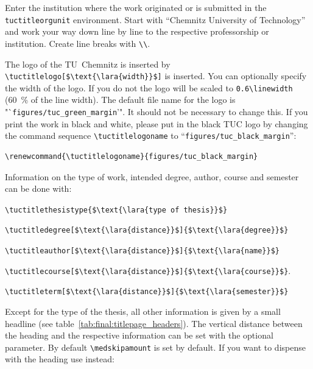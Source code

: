 Enter the institution where the work originated or is submitted in the
\texttt{tuctitleorgunit} environment. Start with "`Chemnitz University of
Technology"' and work your way down line by line to the respective
professorship or institution. Create line breaks with \verb+\\+.

The logo of the TU~Chemnitz is inserted by \lstinline[language={[LaTeX]{TeX}},mathescape]+\tuctitlelogo[$\text{\lara{width}}$]+
is inserted. You can optionally specify the width of the logo. If you do not
the logo will be scaled to \verb+0.6\linewidth+ (\qty{60}{\percent} of the line
width). The default file name for the logo is "`\texttt{figures/tuc\_green\_margin}'".
It should not be necessary to change this. If you print the work in black and
white, please put in the black TUC logo by changing the command sequence
\verb+\tuctitlelogoname+ to "`\texttt{figures/tuc\_black\_margin}"':
%
\begin{lstlisting}[language={[LaTeX]{TeX}},style=block]
\renewcommand{\tuctitlelogoname}{figures/tuc_black_margin}
\end{lstlisting}

Information on the type of work, intended degree, author, course and semester
can be done with:

\begin{compactitem}
\item \lstinline[language={[LaTeX]{TeX}},mathescape]+\tuctitlethesistype{$\text{\lara{type of thesis}}$}+
\item \lstinline[language={[LaTeX]{TeX}},mathescape]+\tuctitledegree[$\text{\lara{distance}}$]{$\text{\lara{degree}}$}+
\item \lstinline[language={[LaTeX]{TeX}},mathescape]+\tuctitleauthor[$\text{\lara{distance}}$]{$\text{\lara{name}}$}+
\item \lstinline[language={[LaTeX]{TeX}},mathescape]+\tuctitlecourse[$\text{\lara{distance}}$]{$\text{\lara{course}}$}+.
\item \lstinline[language={[LaTeX]{TeX}},mathescape]+\tuctitleterm[$\text{\lara{distance}}$]{$\text{\lara{semester}}$}+
\end{compactitem}

Except for the type of the thesis, all other information is given by a small
headline (see table~\ref{tab:final:titlepage_headers}). The vertical distance
between the heading and the respective information can be set with the optional
parameter. By default \verb+\medskipamount+ is set by default. If you want to
dispense with the heading use instead:

